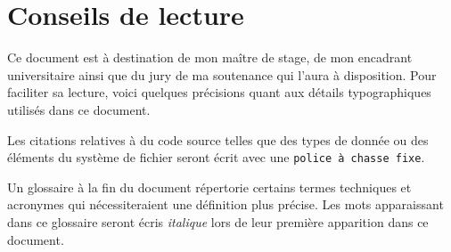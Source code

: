 \section*{Conseils de lecture}
Ce document est à destination de mon maître de stage, de mon encadrant
universitaire ainsi que du jury de ma soutenance qui l'aura à disposition. Pour
faciliter sa lecture, voici quelques précisions quant aux détails typographiques
utilisés dans ce document.

Les citations relatives à du code source telles que des types de donnée ou des
éléments du système de fichier seront écrit avec une {\tt police à chasse fixe}.

Un glossaire à la fin du document répertorie certains termes techniques et
acronymes qui nécessiteraient une définition plus précise. Les mots apparaissant
dans ce glossaire seront écris {\it italique} lors de leur première apparition
dans ce document.
